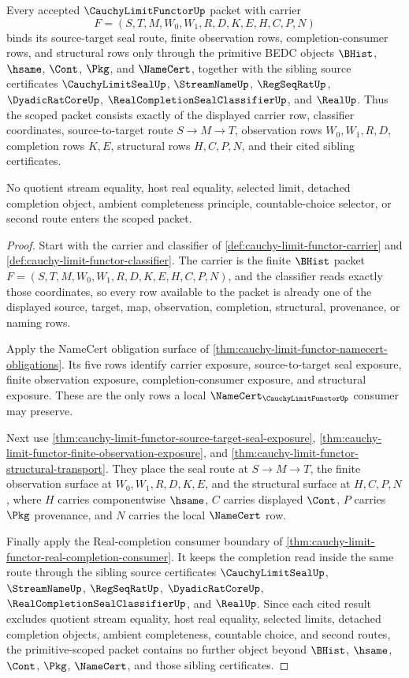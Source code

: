 \begin{theorem}
\label{thm:cauchy-limit-functor-primitive-scope-package}
Every accepted $\CauchyLimitFunctorUp$ packet with carrier
$$
F=(S,T,M,W_0,W_1,R,D,K,E,H,C,P,N)
$$
binds its source-target seal route, finite observation rows, completion-consumer rows, and structural rows only through the primitive BEDC objects $\BHist$, $\hsame$, $\Cont$, $\Pkg$, and $\NameCert$, together with the sibling source certificates $\CauchyLimitSealUp$, $\StreamNameUp$, $\RegSeqRatUp$, $\DyadicRatCoreUp$, $\RealCompletionSealClassifierUp$, and $\RealUp$. Thus the scoped packet consists exactly of the displayed carrier row, classifier coordinates, source-to-target route $S \to M \to T$, observation rows $W_0,W_1,R,D$, completion rows $K,E$, structural rows $H,C,P,N$, and their cited sibling certificates.

No quotient stream equality, host real equality, selected limit, detached completion object, ambient completeness principle, countable-choice selector, or second route enters the scoped packet.
\end{theorem}
\begin{proof}
Start with the carrier and classifier of \autoref{def:cauchy-limit-functor-carrier} and \autoref{def:cauchy-limit-functor-classifier}. The carrier is the finite $\BHist$ packet $F=(S,T,M,W_0,W_1,R,D,K,E,H,C,P,N)$, and the classifier reads exactly those coordinates, so every row available to the packet is already one of the displayed source, target, map, observation, completion, structural, provenance, or naming rows.

Apply the NameCert obligation surface of \autoref{thm:cauchy-limit-functor-namecert-obligations}. Its five rows identify carrier exposure, source-to-target seal exposure, finite observation exposure, completion-consumer exposure, and structural exposure. These are the only rows a local $\NameCert_{\CauchyLimitFunctorUp}$ consumer may preserve.

Next use \autoref{thm:cauchy-limit-functor-source-target-seal-exposure}, \autoref{thm:cauchy-limit-functor-finite-observation-exposure}, and \autoref{thm:cauchy-limit-functor-structural-transport}. They place the seal route at $S \to M \to T$, the finite observation surface at $W_0,W_1,R,D,K,E$, and the structural surface at $H,C,P,N$, where $H$ carries componentwise $\hsame$, $C$ carries displayed $\Cont$, $P$ carries $\Pkg$ provenance, and $N$ carries the local $\NameCert$ row.

Finally apply the Real-completion consumer boundary of \autoref{thm:cauchy-limit-functor-real-completion-consumer}. It keeps the completion read inside the same route through the sibling source certificates $\CauchyLimitSealUp$, $\StreamNameUp$, $\RegSeqRatUp$, $\DyadicRatCoreUp$, $\RealCompletionSealClassifierUp$, and $\RealUp$. Since each cited result excludes quotient stream equality, host real equality, selected limits, detached completion objects, ambient completeness, countable choice, and second routes, the primitive-scoped packet contains no further object beyond $\BHist$, $\hsame$, $\Cont$, $\Pkg$, $\NameCert$, and those sibling certificates.
\end{proof}

